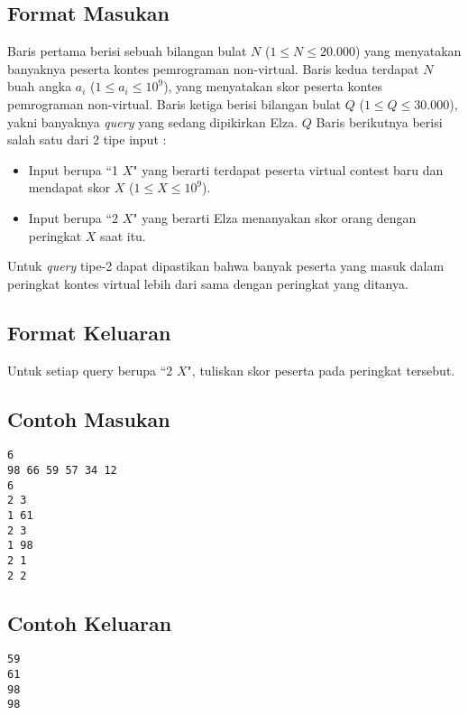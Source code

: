 \documentclass{article}
\begin{document}
\subsection*{Format Masukan}
Baris pertama berisi sebuah bilangan bulat $N$ ($1 \leq N \leq 20.000$) yang menyatakan banyaknya peserta kontes pemrograman non-virtual.
Baris kedua terdapat $N$ buah angka $a_i$ ($1 \leq a_i \leq 10^9$), yang menyatakan skor peserta kontes pemrograman non-virtual. Baris ketiga berisi bilangan bulat $Q$ ($1 \leq Q \leq 30.000$), yakni banyaknya \textit{query} yang sedang dipikirkan Elza.
$Q$ Baris berikutnya berisi salah satu dari 2 tipe input :
\begin{itemize}
    \setlength{\itemsep}{0pt}
    \item Input berupa ``1 $X$" yang berarti terdapat peserta virtual contest baru dan mendapat skor $X$ ($1 \leq X \leq 10^9$).
    \item Input berupa ``2 $X$" yang berarti Elza menanyakan skor orang dengan peringkat $X$ saat itu.
\end{itemize}
Untuk \textit{query} tipe-2 dapat dipastikan bahwa banyak peserta yang masuk dalam peringkat kontes virtual lebih
dari sama dengan peringkat yang ditanya.

\subsection*{Format Keluaran}

Untuk setiap query berupa ``2 $X$", tuliskan skor peserta pada peringkat tersebut.
\\

\begin{multicols}{2}
\subsection*{Contoh Masukan}
\begin{lstlisting}
6
98 66 59 57 34 12
6
2 3
1 61
2 3
1 98
2 1
2 2
\end{lstlisting}
\columnbreak
\subsection*{Contoh Keluaran}
\begin{lstlisting}
59
61
98
98
\end{lstlisting}
\vfill
\null
\end{multicols}


\pagebreak
\end{document}
